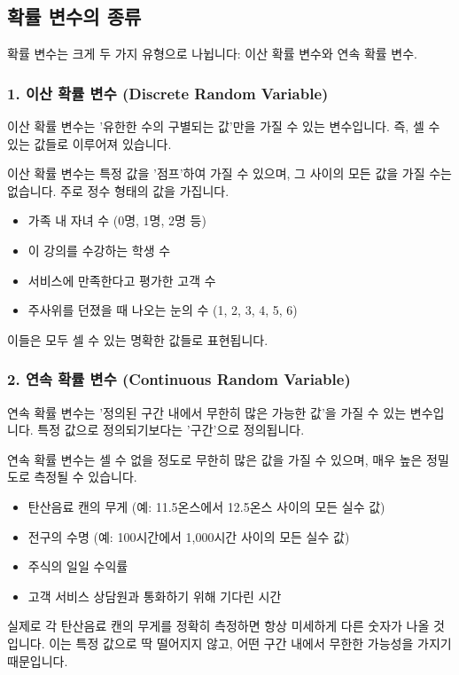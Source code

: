 \documentclass[11pt,a4paper]{book}
\theoremstyle{definition}
\begin{document}
\subsection{확률 변수의 종류}

확률 변수는 크게 두 가지 유형으로 나뉩니다: 이산 확률 변수와 연속 확률 변수.

\subsubsection*{1. 이산 확률 변수 (Discrete Random Variable)}

\begin{summarybox}[title={이산 확률 변수 핵심 요약}]
이산 확률 변수는 '유한한 수의 구별되는 값'만을 가질 수 있는 변수입니다. 즉, 셀 수 있는 값들로 이루어져 있습니다.
\end{summarybox}

이산 확률 변수는 특정 값을 '점프'하여 가질 수 있으며, 그 사이의 모든 값을 가질 수는 없습니다. 주로 정수 형태의 값을 가집니다.

\begin{examplebox}[title={이산 확률 변수 예시}]
\begin{itemize}
    \item 가족 내 자녀 수 (0명, 1명, 2명 등)
    \item 이 강의를 수강하는 학생 수
    \item 서비스에 만족한다고 평가한 고객 수
    \item 주사위를 던졌을 때 나오는 눈의 수 (1, 2, 3, 4, 5, 6)
\end{itemize}
이들은 모두 셀 수 있는 명확한 값들로 표현됩니다.
\end{examplebox}

\subsubsection*{2. 연속 확률 변수 (Continuous Random Variable)}

\begin{summarybox}[title={연속 확률 변수 핵심 요약}]
연속 확률 변수는 '정의된 구간 내에서 무한히 많은 가능한 값'을 가질 수 있는 변수입니다. 특정 값으로 정의되기보다는 '구간'으로 정의됩니다.
\end{summarybox}

연속 확률 변수는 셀 수 없을 정도로 무한히 많은 값을 가질 수 있으며, 매우 높은 정밀도로 측정될 수 있습니다.

\begin{examplebox}[title={연속 확률 변수 예시}]
\begin{itemize}
    \item 탄산음료 캔의 무게 (예: 11.5온스에서 12.5온스 사이의 모든 실수 값)
    \item 전구의 수명 (예: 100시간에서 1,000시간 사이의 모든 실수 값)
    \item 주식의 일일 수익률
    \item 고객 서비스 상담원과 통화하기 위해 기다린 시간
\end{itemize}
실제로 각 탄산음료 캔의 무게를 정확히 측정하면 항상 미세하게 다른 숫자가 나올 것입니다. 이는 특정 값으로 딱 떨어지지 않고, 어떤 구간 내에서 무한한 가능성을 가지기 때문입니다.
\end{examplebox}
\end{document}
